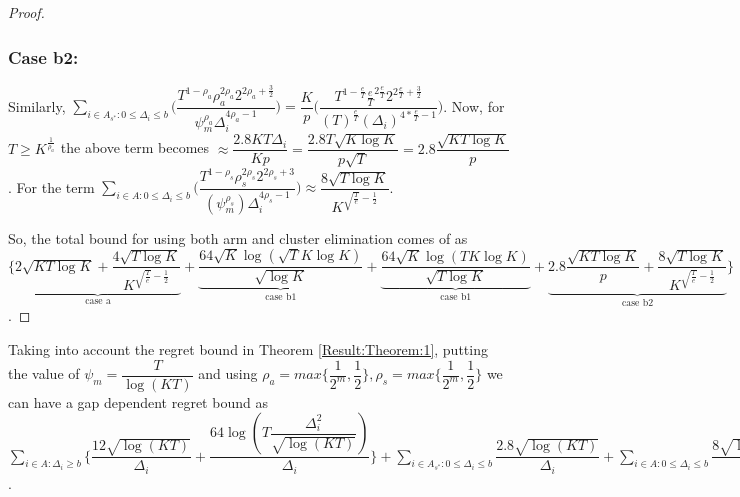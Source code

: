 \begin{proof}
\subsubsection{Case b2:}
\par Similarly, $\sum\limits_{i\in A_{s^{*}}:0\leq\Delta_{i}\leq b}\bigg(\dfrac{T^{1-\rho_{a}}\rho_{a}^{2\rho_{a}}2^{2\rho_{a}+\frac{3}{2}}}{\psi_{m}^{\rho_{a}}\Delta_{i}^{4\rho_{a}-1}} \bigg)=\dfrac{K}{p}\bigg(\dfrac{T^{1-\frac{e}{T}}\frac{e}{T}^{2\frac{e}{T}}2^{2\frac{e}{T}+\frac{3}{2}}}{{(T)^{\frac{e}{T}}}{(\Delta_{i})^{4*\frac{e}{T}-1}}} \bigg) $. Now, for $T\geq K^{\frac{1}{\rho_{a}}}$ the above term becomes $\approx \dfrac{2.8KT\Delta_{i}}{Kp}=\dfrac{2.8T\sqrt{K\log K}}{p\sqrt{T}}= 2.8\dfrac{\sqrt{KT\log K}}{p}$. For the term $\sum\limits_{i\in A:0\leq\Delta_{i}\leq b}\bigg(\dfrac{T^{1-\rho_{s}}\rho_{s}^{2\rho_{s}}2^{2\rho_{s}+3}}{(\psi_{m}^{\rho_{s}})\Delta_{i}^{4\rho_{s} -1}} \bigg)\approx \dfrac{8\sqrt{T\log K}}{K^{\sqrt{\frac{T}{e}}-\frac{1}{2}}}$.

So, the total bound for using both arm and cluster elimination comes of as $\bigg\lbrace \underbrace{2\sqrt{KT\log K} + \dfrac{4\sqrt{T\log K}}{K^{\sqrt{\frac{T}{e}}-\frac{1}{2}}}}_{\text{case a}} + \underbrace{\dfrac{64\sqrt{K}\log{(\sqrt{T}K\log K)}}{\sqrt{\log K}}}_{\text{case b1}} + \underbrace{\dfrac{64\sqrt{K}\log{(TK\log K)}}{\sqrt{T\log K}}}_{\text{case b1}} + \underbrace{2.8\dfrac{\sqrt{KT\log K}}{p} + \dfrac{8\sqrt{T\log K}}{K^{\sqrt{\frac{T}{e}}-\frac{1}{2}}}}_{\text{case b2}} \bigg\rbrace$.
\end{proof}

\begin{corollary}
Taking into account the regret bound in Theorem \ref{Result:Theorem:1}, putting the value of $\psi_{m}=\dfrac{T}{\log (KT)}$ and using $\rho_{a}=max\bigg\lbrace\dfrac{1}{2^{m}},\dfrac{1}{2}\bigg\rbrace,\rho_{s}=max\bigg\lbrace\dfrac{1}{2^{m}},\dfrac{1}{2}\bigg\rbrace $ we can have a gap dependent regret bound as $ \sum_{i\in A:\Delta_{i}\geq b}\bigg\lbrace\dfrac{12\sqrt{\log (KT)}}{\Delta_{i}}  + \dfrac{64\log{(T\dfrac{\Delta_{i}^{2}}{\sqrt{\log (KT)}})}}{\Delta_{i}}\bigg\rbrace + \sum\limits_{i\in A_{s^{*}}:0\leq\Delta_{i}\leq b}\dfrac{2.8\sqrt{\log (KT)}}{\Delta_{i}} + \sum\limits_{i\in A:0\leq\Delta_{i}\leq b}\dfrac{8\sqrt{\log (KT)}}{\Delta_{i}}$.
\end{corollary}

